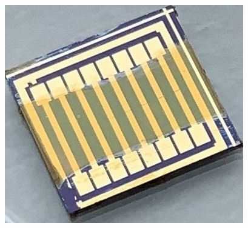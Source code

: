\documentclass[
  letterpaper,
  DIV=11,
  numbers=noendperiod]{scrartcl}
\begin{document}
\begin{figure}
\begin{minipage}[t]{0.47\linewidth}
{{\includegraphics{figures/ch4/IMG_0845_2.jpg}

}

}

\subcaption{\label{fig-single-device-photo}}
\end{minipage}%
%
\begin{minipage}[t]{0.05\linewidth}

{\centering 

~

}

\end{minipage}%
%
\begin{minipage}[t]{0.47\linewidth}

{\centering 

}
\end{minipage}
\end{figure}
\end{document}
